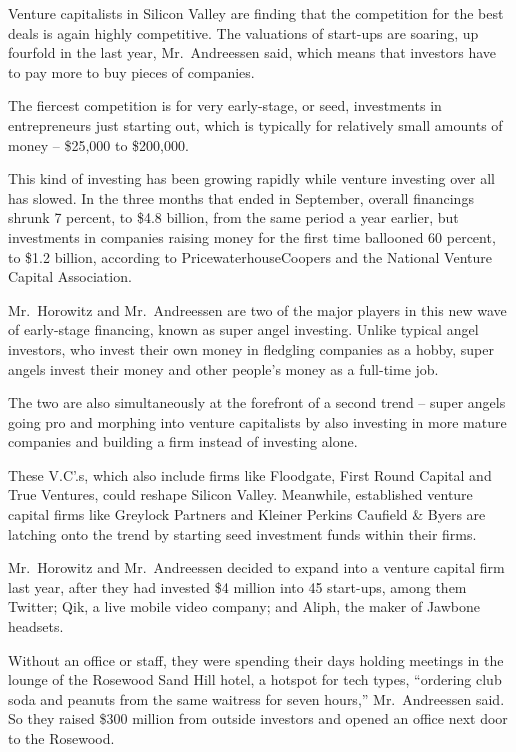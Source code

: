 ﻿\documentclass[12pt]{article}
\begin{document}
Venture capitalists in Silicon Valley are finding that the competition for the best deals is again
highly competitive. The valuations of start-ups are soaring, up fourfold in the last year,
Mr.~Andreessen said, which means that investors have to pay more to buy pieces of companies.

The fiercest competition is for very early-stage, or seed, investments in entrepreneurs just
starting out, which is typically for relatively small amounts of money -- \$25,000 to \$200,000.

This kind of investing has been growing rapidly while venture investing over all has slowed. In the
three months that ended in September, overall financings shrunk 7 percent, to \$4.8 billion, from
the same period a year earlier, but investments in companies raising money for the first time
ballooned 60 percent, to \$1.2 billion, according to PricewaterhouseCoopers and the National Venture
Capital Association.

Mr.~Horowitz and Mr.~Andreessen are two of the major players in this new wave of early-stage
financing, known as super angel investing. Unlike typical angel investors, who invest their own
money in fledgling companies as a hobby, super angels invest their money and other people's money as
a full-time job.

The two are also simultaneously at the forefront of a second trend -- super angels going pro and
morphing into venture capitalists by also investing in more mature companies and building a firm
instead of investing alone.

These V.C'.s, which also include firms like Floodgate, First Round Capital and True Ventures, could
reshape Silicon Valley. Meanwhile, established venture capital firms like Greylock Partners and
Kleiner Perkins Caufield \& Byers are latching onto the trend by starting seed investment funds
within their firms.

Mr.~Horowitz and Mr.~Andreessen decided to expand into a venture capital firm last year, after they
had invested \$4 million into 45 start-ups, among them Twitter; Qik, a live mobile video company;
and Aliph, the maker of Jawbone headsets.

Without an office or staff, they were spending their days holding meetings in the lounge of the
Rosewood Sand Hill hotel, a hotspot for tech types, ``ordering club soda and peanuts from the same
waitress for seven hours,'' Mr.~Andreessen said. So they raised \$300 million from outside investors
and opened an office next door to the Rosewood.
\end{document}

